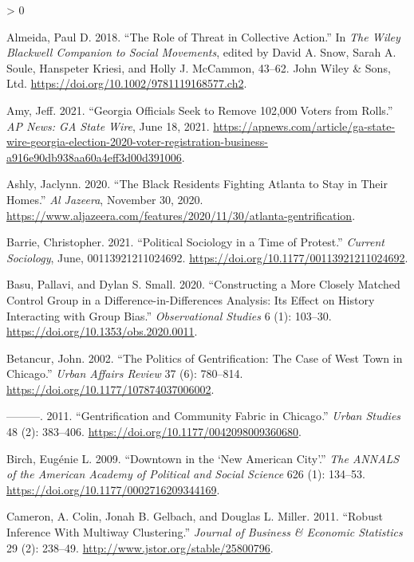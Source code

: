 \documentclass[
  12pt,
]{article}
\newlength{\cslhangindent}
\newenvironment{CSLReferences}[2] %
 {%
  \setlength{\parindent}{0pt}
  \ifodd #1 \everypar{\setlength{\hangindent}{\cslhangindent}}\ignorespaces\fi
  \ifnum #2 > 0
  \setlength{\parskip}{#2\baselineskip}
  \fi
 }%
 {}
\begin{document}
\hypertarget{refs}{}
\begin{CSLReferences}{1}{0}
\leavevmode\hypertarget{ref-Almeida2018}{}%
Almeida, Paul D. 2018. {``The {Role} of {Threat} in {Collective Action}.''} In \emph{The {Wiley Blackwell Companion} to {Social Movements}}, edited by David A. Snow, Sarah A. Soule, Hanspeter Kriesi, and Holly J. McCammon, 43--62. {John Wiley \& Sons, Ltd}. \url{https://doi.org/10.1002/9781119168577.ch2}.

\leavevmode\hypertarget{ref-Amy2021}{}%
Amy, Jeff. 2021. {``Georgia Officials Seek to Remove 102,000 Voters from Rolls.''} \emph{AP News: GA State Wire}, June 18, 2021. \url{https://apnews.com/article/ga-state-wire-georgia-election-2020-voter-registration-business-a916e90db938aa60a4eff3d00d391006}.

\leavevmode\hypertarget{ref-Ashly2020}{}%
Ashly, Jaclynn. 2020. {``The {Black} Residents Fighting {Atlanta} to Stay in Their Homes.''} \emph{Al Jazeera}, November 30, 2020. \url{https://www.aljazeera.com/features/2020/11/30/atlanta-gentrification}.

\leavevmode\hypertarget{ref-Barrie2021}{}%
Barrie, Christopher. 2021. {``Political Sociology in a Time of Protest.''} \emph{Current Sociology}, June, 00113921211024692. \url{https://doi.org/10.1177/00113921211024692}.

\leavevmode\hypertarget{ref-Basu2020}{}%
Basu, Pallavi, and Dylan S. Small. 2020. {``Constructing a {More Closely Matched Control Group} in a {Difference-in-Differences Analysis}: {Its Effect} on {History Interacting} with {Group Bias}.''} \emph{Observational Studies} 6 (1): 103--30. \url{https://doi.org/10.1353/obs.2020.0011}.

\leavevmode\hypertarget{ref-Betancur2002}{}%
Betancur, John. 2002. {``The {Politics} of {Gentrification}: {The Case} of {West Town} in {Chicago}.''} \emph{Urban Affairs Review} 37 (6): 780--814. \url{https://doi.org/10.1177/107874037006002}.

\leavevmode\hypertarget{ref-Betancur2011}{}%
---------. 2011. {``Gentrification and {Community Fabric} in {Chicago}.''} \emph{Urban Studies} 48 (2): 383--406. \url{https://doi.org/10.1177/0042098009360680}.

\leavevmode\hypertarget{ref-Birch2009}{}%
Birch, Eugénie L. 2009. {``Downtown in the {`{New American City}'}.''} \emph{The ANNALS of the American Academy of Political and Social Science} 626 (1): 134--53. \url{https://doi.org/10.1177/0002716209344169}.

\leavevmode\hypertarget{ref-Cameron2011}{}%
Cameron, A. Colin, Jonah B. Gelbach, and Douglas L. Miller. 2011. {``Robust {Inference With Multiway Clustering}.''} \emph{Journal of Business \& Economic Statistics} 29 (2): 238--49. \url{http://www.jstor.org/stable/25800796}.


\end{CSLReferences}
\end{document}
